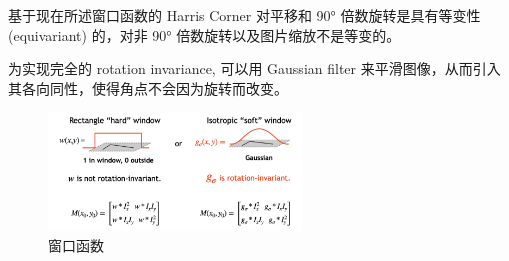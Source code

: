 \begin{note}
基于现在所述窗口函数的 Harris Corner 对平移和 90° 倍数旋转是具有等变性 (equivariant) 的，对非 90° 倍数旋转以及图片缩放不是等变的。

为实现完全的 rotation invariance, 可以用 Gaussian filter 来平滑图像，从而引入其各向同性，使得角点不会因为旋转而改变。

\begin{figure}[htbp]
    \centering
    \includegraphics[width=0.6\textwidth]{figures/window-function.png}
    \caption{窗口函数}
\end{figure}


\end{note}
